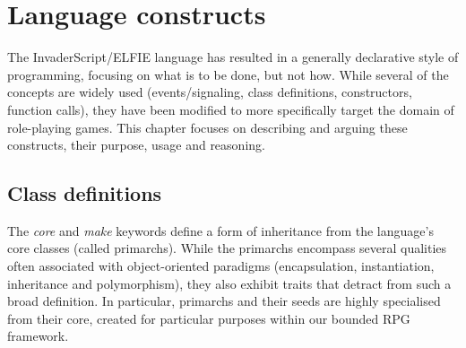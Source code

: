 \section{Language constructs}
The InvaderScript/ELFIE language has resulted in a generally declarative style of programming, focusing on what is to be done, but not how. While several of the concepts are widely used (events/signaling, class definitions, constructors, function calls), they have been modified to more specifically target the domain of role-playing games. This chapter focuses on describing and arguing these constructs, their purpose, usage and reasoning.

\subsection{Class definitions}
The \emph{core} and \emph{make}  keywords define a form of inheritance from the language's core classes (called primarchs). While the primarchs encompass several qualities often associated with object-oriented paradigms (encapsulation, instantiation, inheritance and polymorphism), they also exhibit traits that detract from such a broad definition. In particular, primarchs and their seeds  are highly specialised from their core, created for particular purposes within our bounded RPG framework.


